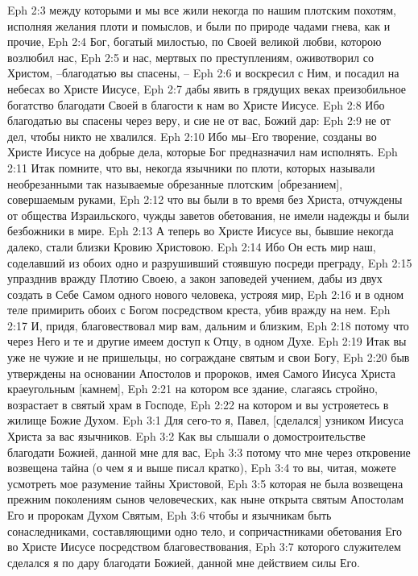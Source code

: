 Eph 2:3  между которыми и мы все жили некогда по нашим плотским похотям, исполняя желания плоти и помыслов, и были по природе чадами гнева, как и прочие,
Eph 2:4  Бог, богатый милостью, по Своей великой любви, которою возлюбил нас,
Eph 2:5  и нас, мертвых по преступлениям, оживотворил со Христом, --благодатью вы спасены, --
Eph 2:6  и воскресил с Ним, и посадил на небесах во Христе Иисусе,
Eph 2:7  дабы явить в грядущих веках преизобильное богатство благодати Своей в благости к нам во Христе Иисусе.
Eph 2:8  Ибо благодатью вы спасены через веру, и сие не от вас, Божий дар:
Eph 2:9  не от дел, чтобы никто не хвалился.
Eph 2:10  Ибо мы--Его творение, созданы во Христе Иисусе на добрые дела, которые Бог предназначил нам исполнять.
Eph 2:11  Итак помните, что вы, некогда язычники по плоти, которых называли необрезанными так называемые обрезанные плотским [обрезанием], совершаемым руками,
Eph 2:12  что вы были в то время без Христа, отчуждены от общества Израильского, чужды заветов обетования, не имели надежды и были безбожники в мире.
Eph 2:13  А теперь во Христе Иисусе вы, бывшие некогда далеко, стали близки Кровию Христовою.
Eph 2:14  Ибо Он есть мир наш, соделавший из обоих одно и разрушивший стоявшую посреди преграду,
Eph 2:15  упразднив вражду Плотию Своею, а закон заповедей учением, дабы из двух создать в Себе Самом одного нового человека, устрояя мир,
Eph 2:16  и в одном теле примирить обоих с Богом посредством креста, убив вражду на нем.
Eph 2:17  И, придя, благовествовал мир вам, дальним и близким,
Eph 2:18  потому что через Него и те и другие имеем доступ к Отцу, в одном Духе.
Eph 2:19  Итак вы уже не чужие и не пришельцы, но сограждане святым и свои Богу,
Eph 2:20  быв утверждены на основании Апостолов и пророков, имея Самого Иисуса Христа краеугольным [камнем],
Eph 2:21  на котором все здание, слагаясь стройно, возрастает в святый храм в Господе,
Eph 2:22  на котором и вы устрояетесь в жилище Божие Духом.
Eph 3:1  Для сего-то я, Павел, [сделался] узником Иисуса Христа за вас язычников.
Eph 3:2  Как вы слышали о домостроительстве благодати Божией, данной мне для вас,
Eph 3:3  потому что мне через откровение возвещена тайна (о чем я и выше писал кратко),
Eph 3:4  то вы, читая, можете усмотреть мое разумение тайны Христовой,
Eph 3:5  которая не была возвещена прежним поколениям сынов человеческих, как ныне открыта святым Апостолам Его и пророкам Духом Святым,
Eph 3:6  чтобы и язычникам быть сонаследниками, составляющими одно тело, и сопричастниками обетования Его во Христе Иисусе посредством благовествования,
Eph 3:7  которого служителем сделался я по дару благодати Божией, данной мне действием силы Его.
